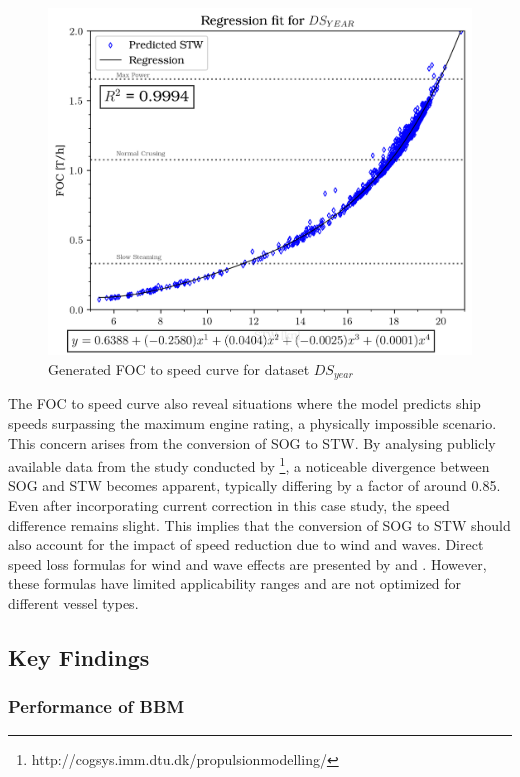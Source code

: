 \documentclass[]{interact}
\theoremstyle{plain}%
\theoremstyle{definition}
\theoremstyle{remark}
\begin{document}
\begin{figure}
  \label{fig:foc_curve_rfr_dsyear}
  \centering
  \includegraphics[width=.8\textwidth]{00_figures/rfr_year_foccurve.png}
  \caption{Generated FOC to speed curve for dataset $DS_{year}$}
\end{figure}

The FOC to speed curve also reveal situations where the model predicts ship speeds surpassing the maximum engine rating, a physically impossible scenario. This concern arises from the conversion of SOG to STW. By analysing publicly available data from the study conducted by \citet{JoanPeturPetersen.2011}\footnote{http://cogsys.imm.dtu.dk/propulsionmodelling/}, a noticeable divergence between SOG and STW becomes apparent, typically differing by a factor of around 0.85. Even after incorporating current correction in this case study, the speed difference remains slight. This implies that the conversion of SOG to STW should also account for the impact of speed reduction due to wind and waves. Direct speed loss formulas for wind and wave effects are presented by \citet{Aertssen.1975} and \citet{kwon.2008}. However, these formulas have limited applicability ranges and are not optimized for different vessel types.

\subsection{Key Findings}\label{sec:key_finding}

\subsubsection{Performance of BBM}
\end{document}
